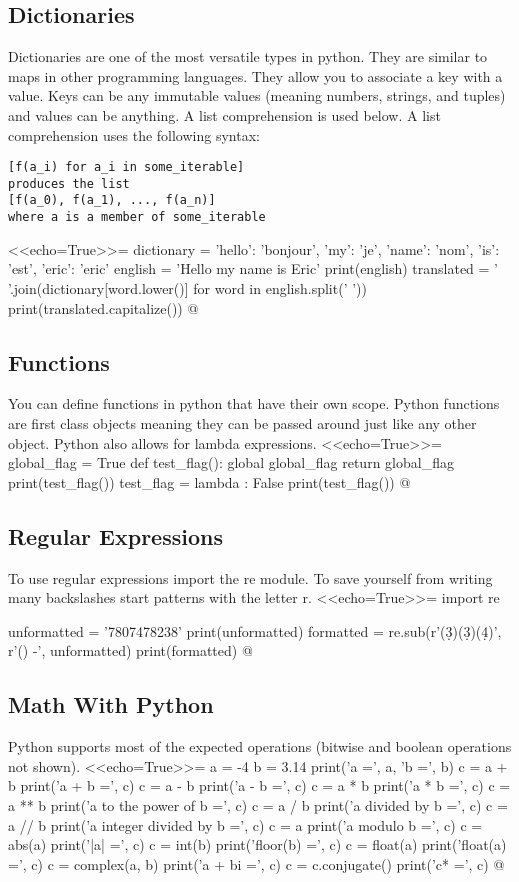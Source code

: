 \documentclass[12pt]{exam}
\begin{document}
\subsection*{Dictionaries}
Dictionaries are one of the most versatile types in python. They are similar to maps in other programming languages.
They allow you to associate a key with a value. Keys can be any immutable values (meaning numbers, strings, and tuples)
and values can be anything. A list comprehension is used below. A list comprehension uses the following syntax:
\begin{verbatim}
[f(a_i) for a_i in some_iterable]
produces the list
[f(a_0), f(a_1), ..., f(a_n)]
where a is a member of some_iterable
\end{verbatim}
<<echo=True>>=
dictionary = {
    'hello': 'bonjour',
    'my': 'je',
    'name': 'nom',
    'is': 'est',
    'eric': 'eric'
}
english = 'Hello my name is Eric'
print(english)
translated = ' '.join(dictionary[word.lower()] for word in english.split(' '))
print(translated.capitalize())
@

\subsection*{Functions}
You can define functions in python that have their own scope. Python functions are first class objects meaning they can
be passed around just like any other object. Python also allows for lambda expressions.
<<echo=True>>=
global_flag = True
def test_flag():
    global global_flag
    return global_flag
print(test_flag())
test_flag = lambda : False
print(test_flag())
@

\subsection*{Regular Expressions}
To use regular expressions import the re module. To save yourself from writing many backslashes start patterns with the
letter r.
<<echo=True>>=
import re

unformatted = '7807478238'
print(unformatted)
formatted = re.sub(r'(\d{3})(\d{3})(\d{4})', r'(\1) \2-\3', unformatted)
print(formatted)
@

\subsection*{Math With Python}
Python supports most of the expected operations (bitwise and boolean operations not shown).
<<echo=True>>=
a = -4
b = 3.14
print('a =', a, 'b =', b)
c = a + b
print('a + b =', c)
c = a - b
print('a - b =', c)
c = a * b
print('a * b =', c)
c = a ** b
print('a to the power of b =', c)
c = a / b
print('a divided by b =', c)
c = a // b
print('a integer divided by b =', c)
c = a %
print('a modulo b =', c)
c = abs(a)
print('|a| =', c)
c = int(b)
print('floor(b) =', c)
c = float(a)
print('float(a) =', c)
c = complex(a, b)
print('a + bi =', c)
c = c.conjugate()
print('c* =', c)
@
\end{document}
